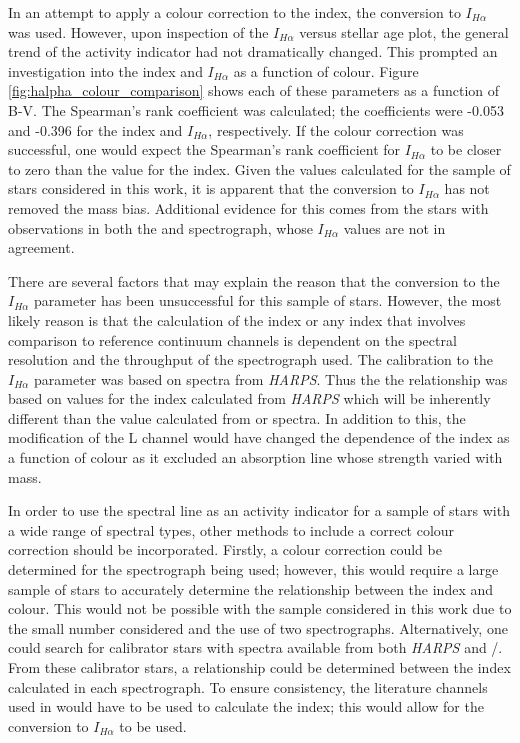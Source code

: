 In an attempt to apply a colour correction to the \Halpha index, the conversion to $I_{H\alpha}$ \citep{Gomes_da_Silva_etal_2014} was used. However, upon inspection of the $I_{H\alpha}$ versus stellar age plot, the general trend of the activity indicator had not dramatically changed. This prompted an investigation into the \Halpha index and $I_{H\alpha}$ as a function of colour. Figure \ref{fig:halpha_colour_comparison} shows each of these parameters as a function of B-V. The Spearman's rank coefficient was calculated; the coefficients were -0.053 and -0.396 for the \Halpha index and $I_{H\alpha}$, respectively. If the colour correction was successful, one would expect the Spearman's rank coefficient for $I_{H\alpha}$ to be closer to zero than the value for the \Halpha index. Given the values calculated for the sample of stars considered in this work, it is apparent that the conversion to $I_{H\alpha}$ has not removed the mass bias. Additional evidence for this comes from the stars with observations in both the \esp and \narval spectrograph, whose $I_{H\alpha}$ values are not in agreement.

There are several factors that may explain the reason that the conversion to the $I_{H\alpha}$ parameter has been unsuccessful for this sample of stars. However, the most likely reason is that the calculation of the \Halpha index or any index that involves comparison to reference continuum channels is dependent on the spectral resolution and the throughput of the spectrograph used. The calibration to the $I_{H\alpha}$ parameter was based on spectra from \textit{HARPS}. Thus the the relationship was based on values for the \Halpha index calculated from \textit{HARPS} which will be inherently different than the value calculated from \esp or \narval spectra. In addition to this, the modification of the L channel would have changed the dependence of the \Halpha index as a function of colour as it excluded an absorption line whose strength varied with mass.

In order to use the \Halpha spectral line as an activity indicator for a sample of stars with a wide range of spectral types, other methods to include a correct colour correction should be incorporated. Firstly, a colour correction could be determined for the spectrograph being used; however, this would require a large sample of stars to accurately determine the relationship between the \Halpha index and colour. This would not be possible with the sample considered in this work due to the small number considered and the use of two spectrographs. Alternatively, one could search for calibrator stars with spectra available from both \textit{HARPS} and \esp/\narval. From these calibrator stars, a relationship could be determined between the \Halpha index calculated in each spectrograph. To ensure consistency, the literature channels used in \citet{Gomes_da_Silva_etal_2014} would have to be used to calculate the \Halpha index; this would allow for the conversion to $I_{H\alpha}$ to be used.

